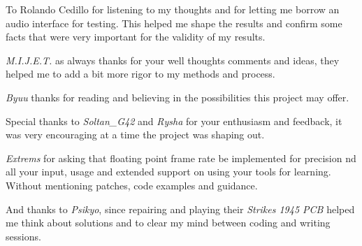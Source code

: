 \documentclass[10pt,a4paper]{report}
\begin{document}
\begin{appendices}
To Rolando Cedillo for listening to my thoughts and for letting me borrow an audio interface for testing. This helped me shape the results and confirm some facts that were very important for the validity of my results.

\textit{M.I.J.E.T.} as always thanks for your well thoughts comments and ideas, they helped me to add a bit more rigor to my methods and process.

\textit{Byuu} thanks for reading and believing in the possibilities this project may offer.

Special thanks to \textit{Soltan\_G42} and \textit{Rysha} for your enthusiasm and feedback, it was very encouraging at a time the project was shaping out.

\textit{Extrems} for asking that floating point frame rate be implemented for precision nd all your input, usage and extended support on using your tools for learning. Without mentioning patches, code examples and guidance.

And thanks to \textit{Psikyo}, since repairing and playing their \textit{Strikes 1945 PCB} helped me think about solutions and to clear my mind between coding and writing sessions.

\end{appendices}
\end{document}
